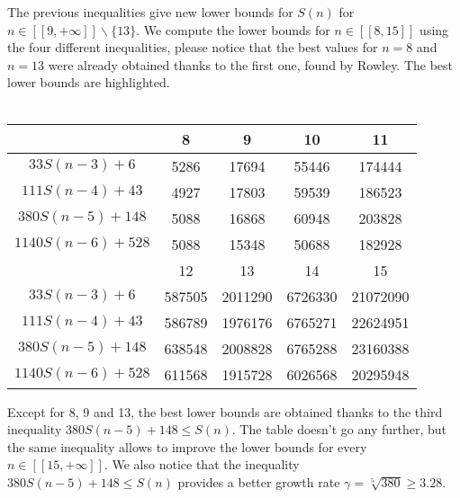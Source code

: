 The previous inequalities give new lower bounds for \(S(n)\) for
\( n \in [\![9,+\infty]\!] \backslash \{13\} \). We compute the lower
bounds for \( n \in [\![8,15]\!] \) using the four different inequalities, please notice that the best values for \( n = 8\) and \(n = 13\) were already obtained thanks to the first one, found by Rowley. The best lower bounds are highlighted.\\
\\
\begin{center}
\begin{tabular}{|*{5}{c|}}
    \hline
	 & 8 & 9 & 10 & 11 \\
	\hline
	\(33S(n-3) + 6 \) & \cellcolor{yellow} 5286 & 17694 & 55446 & 174444\\
	\hline
	\(111S(n-4) + 43 \) & 4927 & \cellcolor{yellow} 17803 & 59539 & 186523\\
	\hline
	\(380S(n-5) + 148 \) & 5088 & 16868 & \cellcolor{yellow} 60948 & \cellcolor{yellow} 203828 \\
	\hline
	\(1140S(n-6) + 528 \) & 5088 & 15348 & 50688 & 182928\\
	\hline
	\hline
	& 12 & 13 & 14 & 15 \\
	\hline
	\(33S(n-3) + 6 \) & 587505 & \cellcolor{yellow} 2011290 & 6726330 & 21072090\\
	\hline
	\(111S(n-4) + 43 \) & 586789 & 1976176 & 6765271 & 22624951 \\
	\hline
	\(380S(n-5) + 148 \) & \cellcolor{yellow} 638548 & 2008828 & \cellcolor{yellow} 6765288 & \cellcolor{yellow} 23160388 \\
	\hline
	\(1140S(n-6) + 528 \) & 611568 & 1915728 & 6026568 & 20295948 \\
	\hline
\end{tabular}
\end{center}
Except for 8, 9 and 13, the best lower bounds are obtained thanks to
the third inequality \( 380S(n-5) + 148 \leqslant S(n) \). The table
doesn't go any further, but the same inequality allows to improve the
lower bounds for every \( n \in [\![15,+\infty]\!] \). We also notice
that the inequality \(380S(n-5) + 148 \leqslant S(n) \) provides a better growth rate \(\gamma = \sqrt[5]{380} \geqslant 3.28 \).